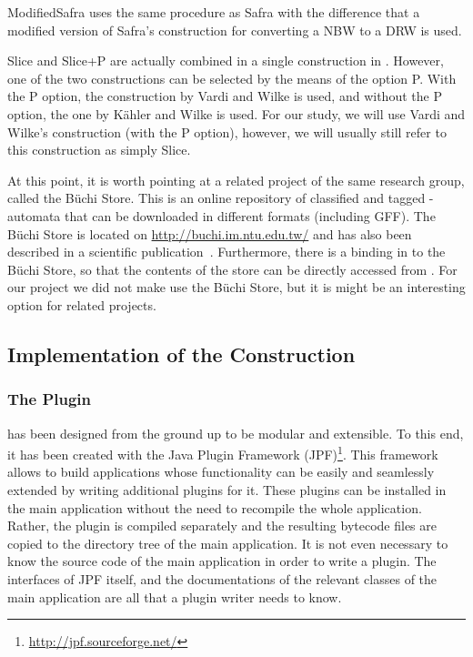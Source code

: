 ModifiedSafra uses the same procedure as Safra with the difference that a modified version of Safra's construction for converting a NBW to a DRW is used.

Slice and Slice+P are actually combined in a single construction in \goal. However, one of the two constructions can be selected by the means of the option P. With the P option, the construction by Vardi and Wilke is used, and without the P option, the one by Kähler and Wilke is used. For our study, we will use Vardi and Wilke's construction (with the P option), however, we will usually still refer to this construction as simply Slice.

At this point, it is worth pointing at a related project of the same research group, called the Büchi Store. This is an online repository of classified and tagged \om-automata that can be downloaded in different formats (including GFF). The Büchi Store is located on \url{http://buchi.im.ntu.edu.tw/} and has also been described in a scientific publication~\cite{2011_buchi_store}. Furthermore, there is a binding in \goal{} to the Büchi Store, so that the contents of the store can be directly accessed from \goal{}. For our project we did not make use the Büchi Store, but it is might be an interesting option for related projects.


\subsection{Implementation of the Construction}
\label{4_implementation}
\subsubsection{The \goal{} Plugin}
\goal{} has been designed from the ground up to be modular and extensible. To this end, it has been created with the Java Plugin Framework (JPF)\footnote{\url{http://jpf.sourceforge.net/}}. This framework allows to build applications whose functionality can be easily and seamlessly extended by writing additional plugins for it. These plugins can be installed in the main application without the need to recompile the whole application. Rather, the plugin is compiled separately and the resulting bytecode files are copied to the directory tree of the main application. It is not even necessary to know the source code of the main application in order to write a plugin. The interfaces of JPF itself, and the documentations of the relevant classes of the main application are all that a plugin writer needs to know.

